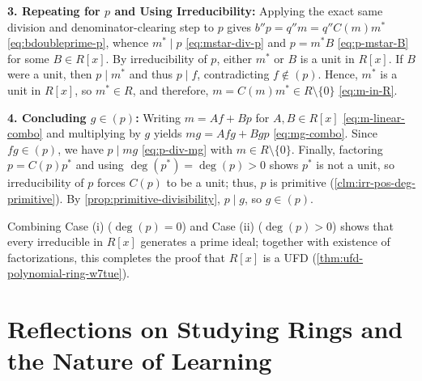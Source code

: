 \begin{proofWrapper}
\begin{content}
\textbf{3. Repeating for $p$ and Using Irreducibility:} Applying the exact same division and denominator-clearing step to $p$ gives $b'' p = q'' m = q'' C(m) m^*$ \eqref{eq:bdoubleprime-p}, whence $m^* \mid p$ \eqref{eq:mstar-div-p} and $p = m^* B$ \eqref{eq:p-mstar-B} for some $B \in R[x]$. By irreducibility of $p$, either $m^*$ or $B$ is a unit in $R[x]$. If $B$ were a unit, then $p \mid m^*$ and thus $p \mid f$, contradicting $f \notin (p)$. Hence, $m^*$ is a unit in $R[x]$, so $m^* \in R$, and therefore, $m = C(m) m^* \in R \setminus \{0\}$ \eqref{eq:m-in-R}.

\textbf{4. Concluding $g \in (p)$:} Writing $m = Af + Bp$ for $A, B \in R[x]$ \eqref{eq:m-linear-combo} and multiplying by $g$ yields $mg = Afg + Bgp$ \eqref{eq:mg-combo}. Since $fg \in (p)$, we have $p \mid mg$ \eqref{eq:p-div-mg} with $m \in R \setminus \{0\}$. Finally, factoring $p = C(p) p^*$ and using $\deg(p^*) = \deg(p) > 0$ shows $p^*$ is not a unit, so irreducibility of $p$ forces $C(p)$ to be a unit; thus, $p$ is primitive (\cref{clm:irr-pos-deg-primitive}). By \cref{prop:primitive-divisibility}, $p \mid g$, so $g \in (p)$.

Combining Case (i) ($\deg(p) = 0$) and Case (ii) ($\deg(p) > 0$) shows that every irreducible in $R[x]$ generates a prime ideal; together with existence of factorizations, this completes the proof that $R[x]$ is a UFD (\cref{thm:ufd-polynomial-ring-w7tue}).
\end{content}

\end{proofWrapper}

\section{Reflections on Studying Rings and the Nature of Learning}


